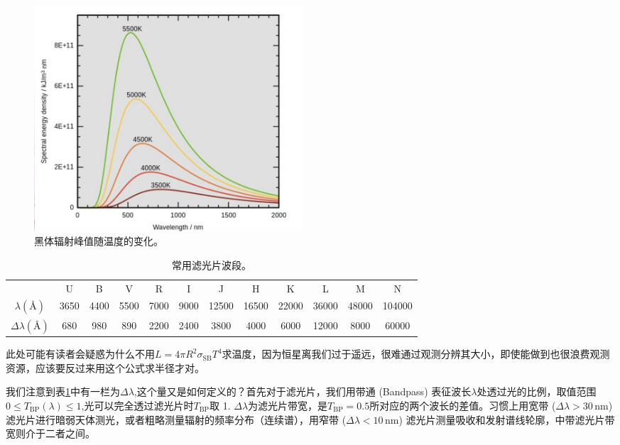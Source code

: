 \documentclass[../天体物理基础.tex]{subfiles}
\begin{document}
\begin{figure}[!htbp]
\centering
\includegraphics[width=10cm]{figures/figure1_1.png}
\captionsetup{justification=raggedright, singlelinecheck=false}
\caption{黑体辐射峰值随温度的变化。}
\label{黑体辐射峰值随温度的变化。}
\end{figure}

\begin{table}[htbp]
\centering
\caption{常用滤光片波段。}
\begin{tabular}{c c c c c c c c c c c c}
\hline
 & U & B & V & R & I & J & H & K & L & M & N\\
\cline{1-12}
$\lambda\left(\si{\angstrom}\right)$ & 3650 & 4400 & 5500 & 7000 & 9000 & 12500 & 16500 & 22000 & 36000 & 48000 & 104000\\
\cline{1-12}
$\Delta{}\lambda\left(\si{\angstrom}\right)$ & 680 & 980 & 890 & 2200 & 2400 & 3800 & 4000 & 6000 & 12000 & 8000 & 60000\\
\cline{1-12}
\end{tabular}
\label{常用滤光片波段。}
\end{table}

此处可能有读者会疑惑为什么不用$L=4\pi R^{2}\sigma_{\text{SB}}T^{4}$求温度，因为恒星离我们过于遥远，很难通过观测分辨其大小，即使能做到也很浪费观测资源，应该要反过来用这个公式求半径才对。

我们注意到表\ref{常用滤光片波段。}中有一栏为$\Delta{}\lambda$,这个量又是如何定义的？首先对于滤光片，我们用带通 (Bandpass) 表征波长$\lambda$处透过光的比例，取值范围$0\le T_{\text{BP}}(\lambda)\le 1$,光可以完全透过滤光片时$T_{\text{BP}}$取 1. $\Delta\lambda$为滤光片带宽，是$T_{\text{BP}}=0.5$所对应的两个波长的差值。习惯上用宽带 ($\Delta\lambda>30\,\mathrm{nm}$) 滤光片进行暗弱天体测光，或者粗略测量辐射的频率分布（连续谱），用窄带 ($\Delta\lambda<10\,\mathrm{nm}$) 滤光片测量吸收和发射谱线轮廓，中带滤光片带宽则介于二者之间。
\end{document}
